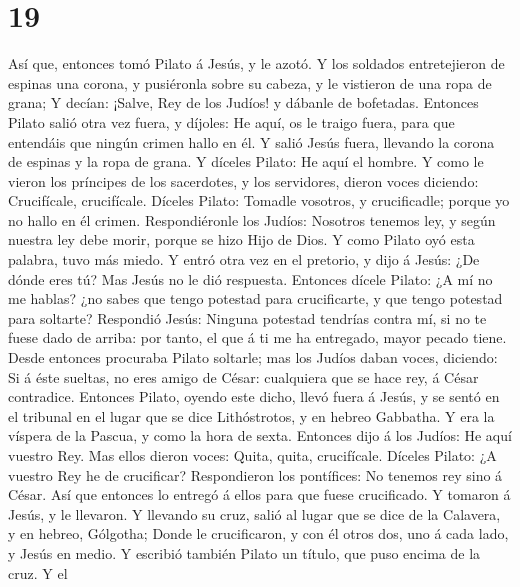 \hypertarget{section-18}{%
\section{19}\label{section-18}}

 Así que, entonces tomó Pilato á Jesús, y le azotó.
 Y los soldados entretejieron de espinas una corona, y
pusiéronla sobre su cabeza, y le vistieron de una ropa de grana;
 Y decían: ¡Salve, Rey de los Judíos! y dábanle de
bofetadas.  Entonces Pilato salió otra vez fuera, y
díjoles: He aquí, os le traigo fuera, para que entendáis que ningún
crimen hallo en él.  Y salió Jesús fuera, llevando la
corona de espinas y la ropa de grana. Y díceles Pilato: He aquí el
hombre.  Y como le vieron los príncipes de los sacerdotes,
y los servidores, dieron voces diciendo: Crucifícale, crucifícale.
Díceles Pilato: Tomadle vosotros, y crucificadle; porque yo no hallo en
él crimen.  Respondiéronle los Judíos: Nosotros tenemos
ley, y según nuestra ley debe morir, porque se hizo Hijo de Dios.
 Y como Pilato oyó esta palabra, tuvo más miedo.
 Y entró otra vez en el pretorio, y dijo á Jesús: ¿De
dónde eres tú? Mas Jesús no le dió respuesta.  Entonces
dícele Pilato: ¿A mí no me hablas? ¿no sabes que tengo potestad para
crucificarte, y que tengo potestad para soltarte? 
Respondió Jesús: Ninguna potestad tendrías contra mí, si no te fuese
dado de arriba: por tanto, el que á ti me ha entregado, mayor pecado
tiene.  Desde entonces procuraba Pilato soltarle; mas los
Judíos daban voces, diciendo: Si á éste sueltas, no eres amigo de César:
cualquiera que se hace rey, á César contradice.  Entonces
Pilato, oyendo este dicho, llevó fuera á Jesús, y se sentó en el
tribunal en el lugar que se dice Lithóstrotos, y en hebreo Gabbatha.
 Y era la víspera de la Pascua, y como la hora de sexta.
Entonces dijo á los Judíos: He aquí vuestro Rey.  Mas
ellos dieron voces: Quita, quita, crucifícale. Díceles Pilato: ¿A
vuestro Rey he de crucificar? Respondieron los pontífices: No tenemos
rey sino á César.  Así que entonces lo entregó á ellos
para que fuese crucificado. Y tomaron á Jesús, y le llevaron.
 Y llevando su cruz, salió al lugar que se dice de la
Calavera, y en hebreo, Gólgotha;  Donde le crucificaron,
y con él otros dos, uno á cada lado, y Jesús en medio.  Y
escribió también Pilato un título, que puso encima de la cruz. Y el
